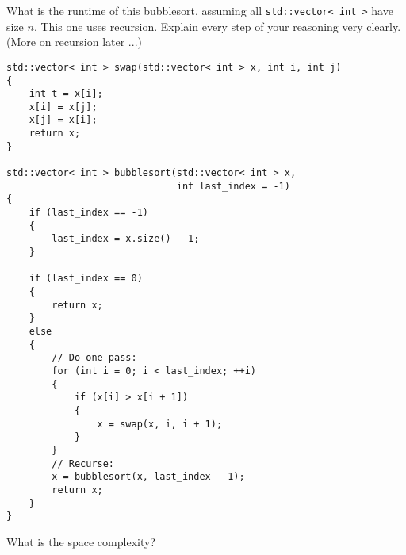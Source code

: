 What is the runtime of this bubblesort, assuming all
\verb!std::vector< int >! have size $n$.
This one uses recursion.
Explain every step of your reasoning very clearly.
(More on recursion later ...)
\begin{Verbatim}[frame=single,fontsize=\small]
std::vector< int > swap(std::vector< int > x, int i, int j)
{
    int t = x[i];
    x[i] = x[j];
    x[j] = x[i];
    return x;
}
  
std::vector< int > bubblesort(std::vector< int > x,
                              int last_index = -1)
{
    if (last_index == -1)
    {
        last_index = x.size() - 1;
    }

    if (last_index == 0)
    {
        return x;
    }
    else
    {
        // Do one pass:
        for (int i = 0; i < last_index; ++i)
        {
            if (x[i] > x[i + 1])
            {
                x = swap(x, i, i + 1);
            }
        }
        // Recurse:
        x = bubblesort(x, last_index - 1);
        return x;
    }
}
\end{Verbatim}
What is the space complexity?

